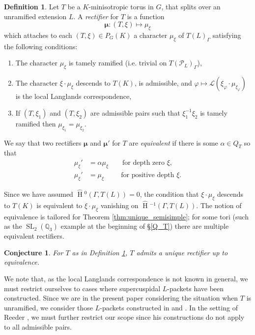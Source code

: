 \documentclass{compositio}
\theoremstyle{plain}
\newtheorem{conjecture}[theorem]{Conjecture}
\newcommand{\HT}[1]{\hat{\HH}{}^{#1}}
\theoremstyle{definition}
\newtheorem{definition}[theorem]{Definition}
\numberwithin{equation}{section}
\DeclareMathOperator{\HH}{H}
\DeclareMathOperator{\SL}{SL}
\newcommand{\PL}{\mathcal{P}_L}
\newcommand{\Lpack}{\mathcal{L}}
\newcommand{\bmu}{\boldsymbol\mu}
\begin{document}
\begin{definition} \label{def:rectifier}
  Let $T$ be a $K$-minisotropic torus in $G$, that splits over an unramified
  extension $L$.  A \emph{rectifier} for $T$ is a function
  $$\bmu : (T, \xi) \mapsto \mu_{\xi}$$
  which attaches to each $(T, \xi) \in P_G(K)$ a character
  $\mu_{\xi}$ of $T(L)_{\Gamma}$ satisfying the following conditions:

\begin{enumerate}
\item The character $\mu_{\xi}$ is tamely ramified (i.e. trivial on
  $T(\PL)_{\Gamma}$),

\item The character $\xi \cdot \mu_{\xi}$ descends to $T(K)$, is admissible,
and $\varphi \mapsto \Lpack(\xi_{\varphi} \cdot \mu_{\xi_{\varphi}})$
  is the local Langlands correspondence,

\item If $(T, \xi_1)$ and $(T, \xi_2)$ are admissible pairs such that
$\xi_1^{-1} \xi_2$ is tamely ramified then
$\mu_{\xi_1} = \mu_{\xi_2}$.
\end{enumerate}
We say that two rectifiers $\bmu$ and $\bmu'$ for $T$ are \emph{equivalent}
if there is some $\alpha \in Q_T$ so that
\begin{align*}
\mu_\xi' &= \alpha \mu_\xi \qquad \mbox{for depth zero $\xi$,} \\
\mu_\xi' &= \mu_\xi \qquad\ \  \mbox{for positive depth $\xi$.}
\end{align*}

\end{definition}

Since we have assumed $\HT{0}(\Gamma,T(L)) = 0$, the condition that $\xi \cdot \mu_\xi$
descends to $T(K)$ is equivalent to $\xi \cdot \mu_\xi$ vanishing on $\HT{-1}(\Gamma, T(L))$.  The
notion of equivalence is tailored for Theorem \ref{thm:unique_semisimple}; for some tori (such as the
$\SL_2(\mathbb{Q}_3)$ example at the beginning of \S \ref{Q_T}) there are
multiple equivalent rectifiers.

\begin{conjecture} \label{conj:unique_rectifier}
For $T$ as in Definition \ref{def:rectifier}, $T$ admits a unique rectifier up to equivalence.
\end{conjecture}

We note that, as the local Langlands correspondence is not known in general, we must restrict
ourselves to cases where supercuspidal $L$-packets have been constructed.
Since we are in the present paper considering the situation when $T$ is unramified,
we consider those $L$-packets constructed in \cite{reeder-debacker:09a} and \cite{reeder:08a}.
In the setting of Reeder \cite{reeder:08a},
we must further restrict our scope since his constructions do not apply to all admissible pairs.
\end{document}
